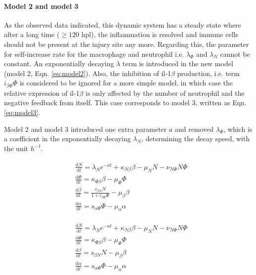 \paragraph{Model 2 and model 3}

As the observed data indicated, this dynamic system has a steady state where after a long time ($\geq 120$ hpl), the  inflammation is resolved and immune cells should not be present at the injury site any more. Regarding this, the parameter for self-increase rate for the macrophage and neutrophil i.e. $\lambda_\Phi$ and $\lambda_N$  cannot be constant. An exponentially decaying $\lambda$ term is introduced in the new model (model 2, Eqn. \ref{eq:model2}). Also, the inhibition of il-1$\beta$ production, i.e. term $i_{\beta\Phi}\Phi$ is considered to be ignored for a more simple model, in which case the relative expression of il-1$\beta$ is only affected by the number of neutrophil and the negative feedback from itself. This case corresponds to model 3, written as Eqn. \ref{eq:model3}.

Model 2 and model 3 introduced one extra parameter $a$ and removed $\lambda_\Phi$, which is a coefficient in the exponentially decaying $\lambda_N$, determining the decay speed, with the unit $h^{-1}$.

\begin{align}
    \label{eq:model2}
    \begin{split}
        &\frac{\mathrm{d} N}{\mathrm{d} t}=\lambda_Ne^{-at}+\kappa_{N\beta}\beta-\mu_NN-\nu_{N\Phi}N\Phi\\
        &\frac{\mathrm{d} \Phi}{\mathrm{d} t}=\kappa_{\Phi\beta}\beta-\mu_\Phi\Phi\\
        &\frac{\mathrm{d} \beta}{\mathrm{d} t}=\frac{s_{\beta N}N}{1+i_{\beta\Phi}\Phi}-\mu_\beta\beta\\
        &\frac{\mathrm{d} \alpha}{\mathrm{d} t}=s_{\alpha\Phi}\Phi-\mu_\alpha\alpha
    \end{split}
\end{align}

\begin{align}
    \label{eq:model3}
    \begin{split}
        &\frac{\mathrm{d} N}{\mathrm{d} t}=\lambda_Ne^{-at}+\kappa_{N\beta}\beta-\mu_NN-\nu_{N\Phi}N\Phi\\
        &\frac{\mathrm{d} \Phi}{\mathrm{d} t}=\kappa_{\Phi\beta}\beta-\mu_\Phi\Phi\\
        &\frac{\mathrm{d} \beta}{\mathrm{d} t}=s_{\beta N}N-\mu_\beta\beta\\
        &\frac{\mathrm{d} \alpha}{\mathrm{d} t}=s_{\alpha\Phi}\Phi-\mu_\alpha\alpha
    \end{split}
\end{align}

